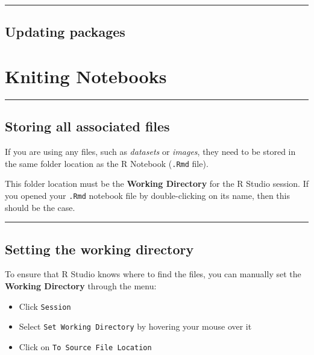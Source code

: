 \documentclass[]{book}
\providecommand{\tightlist}{%
  \setlength{\itemsep}{0pt}\setlength{\parskip}{0pt}}
\begin{document}
\begin{center}\rule{0.5\linewidth}{\linethickness}\end{center}

\section{Updating packages}\label{updating-packages}

\chapter{Kniting Notebooks}\label{kniting-notebooks}

\begin{center}\rule{0.5\linewidth}{\linethickness}\end{center}

\section{Storing all associated
files}\label{storing-all-associated-files}

If you are using any files, such as \emph{datasets} or \emph{images},
they need to be stored in the same folder location as the R Notebook
(\texttt{.Rmd} file).

This folder location must be the \textbf{Working Directory} for the R
Studio session. If you opened your \texttt{.Rmd} notebook file by
double-clicking on its name, then this should be the case.

\begin{center}\rule{0.5\linewidth}{\linethickness}\end{center}

\section{Setting the working
directory}\label{setting-the-working-directory}

To ensure that R Studio knows where to find the files, you can manually
set the \textbf{Working Directory} through the menu:

\begin{itemize}
\tightlist
\item
  Click \texttt{Session}
\item
  Select \texttt{Set\ Working\ Directory} by hovering your mouse over it
\item
  Click on \texttt{To\ Source\ File\ Location}
\end{itemize}
\end{document}
